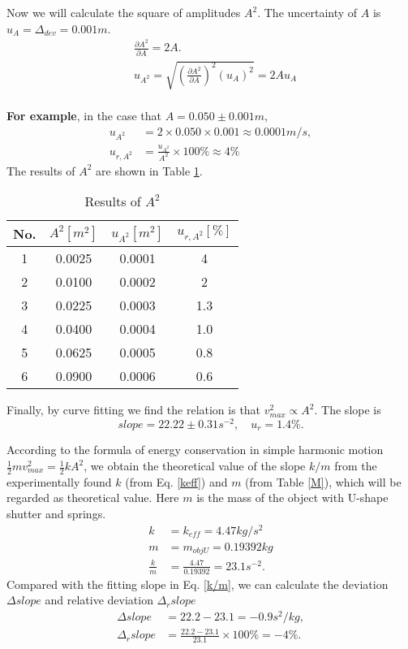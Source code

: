    Now we will calculate the square of amplitudes $A^2$. The uncertainty of $A$ is $u_A=\Delta_{dev}=0.001m$.
    \[
    \begin{split}
        &\frac{\partial A^2}{\partial A}=2A.\\
        &u_{A^2}=\sqrt{(\frac{\partial A^2}{\partial A})^2(u_A)^2}=2Au_A\\[0.4cm]
    \end{split}
    \]

    \textbf{For example}, in the case that $A=0.050\pm 0.001m$,
    \[
    \begin{split}
        u_{A^2}&=2\times0.050\times0.001\approx0.0001m/s,\\
        u_{r,A^2}&=\frac{u_{A^2}}{A^2}\times100\%\approx4\%
    \end{split}
    \]
    The results of $A^2$ are shown in Table \ref{adata2}.
    \begin{table}[!h] \small
        \centering
        \begin{tabular}{|c|c|c|c|}
            \hline
            No. & $A^2[m^2]$ & $u_{A^2}[m^2]$ & $u_{r,A^2}[\%]$\\ \hline
            1 & 0.0025 & 0.0001 & 4\\ \hline
            2 & 0.0100 & 0.0002 & 2\\ \hline
            3 & 0.0225 & 0.0003 & 1.3\\ \hline
            4 & 0.0400 & 0.0004 & 1.0\\ \hline
            5 & 0.0625 & 0.0005 & 0.8\\ \hline
            6 & 0.0900 & 0.0006 & 0.6\\ \hline
        \end{tabular}
        \caption{Results of $A^2$}\label{adata2}
    \end{table}

    Finally, by curve fitting we find the relation is that $v_{max}^2\propto A^2$. The slope is
    \begin{equation}\label{k/m}
        slope=22.22\pm0.31s^{-2}, \quad u_r=1.4\%.
    \end{equation}

    According to the formula of energy conservation in simple harmonic motion $\frac{1}{2}mv_{max}^2=\frac{1}{2}kA^2$, we obtain the theoretical value of the slope $k/m$ from the experimentally found $k$ (from Eq. \ref{keff}) and $m$ (from Table \ref{M}), which will be regarded as theoretical value. Here $m$ is the mass of the object with U-shape shutter and springs.
    \[
    \begin{split}
        k&=k_{eff}=4.47kg/s^2\\
        m&=m_{objU}=0.19392kg\\
        \frac{k}{m}&=\frac{4.47}{0.19392}=23.1s^{-2}.
    \end{split}
    \]
    Compared with the fitting slope in Eq. \ref{k/m}, we can calculate the deviation $\Delta slope$ and relative deviation $\Delta_r slope$
    \[
    \begin{split}
        \Delta slope&=22.2-23.1=-0.9s^2/kg,\\
        \Delta_r slope&=\frac{22.2-23.1}{23.1}\times 100\%=-4\%.
    \end{split}
    \]